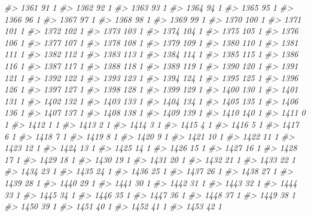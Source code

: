 \documentclass[]{article}
\newenvironment{Shaded}{\begin{snugshade}}{\end{snugshade}}
\newcommand{\CommentTok}[1]{\textcolor[rgb]{0.56,0.35,0.01}{\textit{#1}}}
\begin{document}
\begin{Shaded}
\begin{Highlighting}[]
\CommentTok{#> 1361  91  1}
\CommentTok{#> 1362  92  1}
\CommentTok{#> 1363  93  1}
\CommentTok{#> 1364  94  1}
\CommentTok{#> 1365  95  1}
\CommentTok{#> 1366  96  1}
\CommentTok{#> 1367  97  1}
\CommentTok{#> 1368  98  1}
\CommentTok{#> 1369  99  1}
\CommentTok{#> 1370 100  1}
\CommentTok{#> 1371 101  1}
\CommentTok{#> 1372 102  1}
\CommentTok{#> 1373 103  1}
\CommentTok{#> 1374 104  1}
\CommentTok{#> 1375 105  1}
\CommentTok{#> 1376 106  1}
\CommentTok{#> 1377 107  1}
\CommentTok{#> 1378 108  1}
\CommentTok{#> 1379 109  1}
\CommentTok{#> 1380 110  1}
\CommentTok{#> 1381 111  1}
\CommentTok{#> 1382 112  1}
\CommentTok{#> 1383 113  1}
\CommentTok{#> 1384 114  1}
\CommentTok{#> 1385 115  1}
\CommentTok{#> 1386 116  1}
\CommentTok{#> 1387 117  1}
\CommentTok{#> 1388 118  1}
\CommentTok{#> 1389 119  1}
\CommentTok{#> 1390 120  1}
\CommentTok{#> 1391 121  1}
\CommentTok{#> 1392 122  1}
\CommentTok{#> 1393 123  1}
\CommentTok{#> 1394 124  1}
\CommentTok{#> 1395 125  1}
\CommentTok{#> 1396 126  1}
\CommentTok{#> 1397 127  1}
\CommentTok{#> 1398 128  1}
\CommentTok{#> 1399 129  1}
\CommentTok{#> 1400 130  1}
\CommentTok{#> 1401 131  1}
\CommentTok{#> 1402 132  1}
\CommentTok{#> 1403 133  1}
\CommentTok{#> 1404 134  1}
\CommentTok{#> 1405 135  1}
\CommentTok{#> 1406 136  1}
\CommentTok{#> 1407 137  1}
\CommentTok{#> 1408 138  1}
\CommentTok{#> 1409 139  1}
\CommentTok{#> 1410 140  1}
\CommentTok{#> 1411   0  1}
\CommentTok{#> 1412   1  1}
\CommentTok{#> 1413   2  1}
\CommentTok{#> 1414   3  1}
\CommentTok{#> 1415   4  1}
\CommentTok{#> 1416   5  1}
\CommentTok{#> 1417   6  1}
\CommentTok{#> 1418   7  1}
\CommentTok{#> 1419   8  1}
\CommentTok{#> 1420   9  1}
\CommentTok{#> 1421  10  1}
\CommentTok{#> 1422  11  1}
\CommentTok{#> 1423  12  1}
\CommentTok{#> 1424  13  1}
\CommentTok{#> 1425  14  1}
\CommentTok{#> 1426  15  1}
\CommentTok{#> 1427  16  1}
\CommentTok{#> 1428  17  1}
\CommentTok{#> 1429  18  1}
\CommentTok{#> 1430  19  1}
\CommentTok{#> 1431  20  1}
\CommentTok{#> 1432  21  1}
\CommentTok{#> 1433  22  1}
\CommentTok{#> 1434  23  1}
\CommentTok{#> 1435  24  1}
\CommentTok{#> 1436  25  1}
\CommentTok{#> 1437  26  1}
\CommentTok{#> 1438  27  1}
\CommentTok{#> 1439  28  1}
\CommentTok{#> 1440  29  1}
\CommentTok{#> 1441  30  1}
\CommentTok{#> 1442  31  1}
\CommentTok{#> 1443  32  1}
\CommentTok{#> 1444  33  1}
\CommentTok{#> 1445  34  1}
\CommentTok{#> 1446  35  1}
\CommentTok{#> 1447  36  1}
\CommentTok{#> 1448  37  1}
\CommentTok{#> 1449  38  1}
\CommentTok{#> 1450  39  1}
\CommentTok{#> 1451  40  1}
\CommentTok{#> 1452  41  1}
\CommentTok{#> 1453  42  1}

\end{Highlighting}
\end{Shaded}
\end{document}
